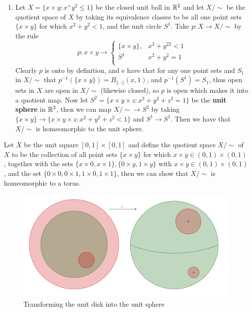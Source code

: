 \begin{example}
    \begin{enumerate}[label=(\arabic*)]
        \item     Let $X=\{x \times y: x^+y^2 \leq 1\}$ be the closed unit ball in $\mathbb{R}^2$ and let  $X/\sim$ be the
    quotient space of  $X$ by taking its equivalence classes to be all one point sets  $\{x \times
    y\}$ for which $x^2+y^2<1$, and the unit circle  $S^1$. Take  $p:X \rightarrow X/\sim$ by the
    rule
        \begin{equation*}
            p:x \times y \rightarrow \begin{cases}
                \{x \times y\}, & x^2+y^22<1 \\
                S^1        & x^2+y^2=1 \\ 
                      \end{cases}
        \end{equation*}
    Clearly $p$ is onto by definition, and e have that for any one point sets and  $ S_1$ in
    $X/\sim$ that  $p^{-1}(\{x \times y\})=B_{||\cdot||}(x,1)$, and $p^{-1}(S^1)=S_1$, thus open
    sets in $X$ are open in  $X/\sim$  (likewise closed), so $p$ is open which makes it into a
    quotient map. Now let  $S^2=\{x \times y \times z: x^2+y^2+z^2=1\}$ be the \textbf{unit sphere}
    in $\mathbb{R}^3$, then we can map  $X/\sim \rightarrow S^2$ by taking  $\{x \times y\} \rightarrow \{x
    \times y \times z: x^2+y^2+z^2<1\}$ and $ S^1 \rightarrow S^1$. Then we have that $X/\sim$ is
    homeomorphic to the unit sphere.		
    \end{enumerate}

        \item Let $X$ be the unit square  $[0,1] \times [0,1]$ and define the quotient space
            $X/\sim$ of $X$ to be the collection of all point sets $\{x \times y\}$ for which $x
            \times y \in (0,1) \times (0,1)$, together with the sets $\{x \times 0, x \times 1\},
            \{0 \times y, 1 \times y\}$ with $x \times y \in (0,1) \times (0,1)$, and the set $\{0
            \times 0, 0 \times 1, 1 \times 0, 1 \times 1\}$, then we can show that $X/\sim$ is
            homeomorphic to a torus.
\end{example} 

\begin{figure}[h] 
    \centering
    \includegraphics[scale = 0.2]{Figures/Chapter2/diskSphere-eps-converted-to.pdf}
    \caption{Transforming the unit disk into the unit sphere}
    \label{fig_2.4}
\end{figure}

